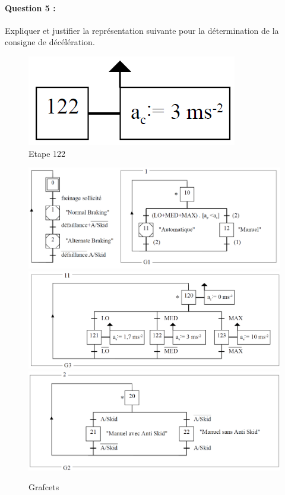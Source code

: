 \paragraph{Question 5 :} Expliquer et justifier la représentation suivante pour la détermination de la consigne de
décélération.

\begin{figure}[!h]
 \begin{center}
 \includegraphics[width=0.3\linewidth]{img/Frein3.png}
 \caption{Etape 122}
 \label{img9}
 \end{center}
\end{figure}

\newpage

\begin{figure}[!h]
 \begin{center}
 \includegraphics[width=1\linewidth]{img/Frein4.png}
 \includegraphics[width=1\linewidth]{img/Frein5.png}
 \includegraphics[width=1\linewidth]{img/Frein6.png}
  \caption{Grafcets}
 \label{img10}
 \end{center}
\end{figure}

\newpage

~\

\newpage

